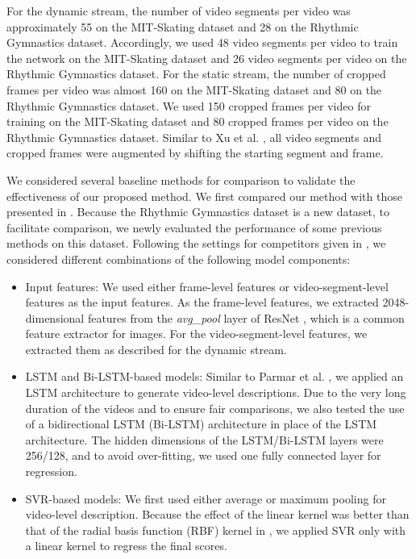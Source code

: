 \documentclass[sigconf]{acmart}
\begin{document}
\vspace{5pt}

For the dynamic stream, the number of video segments per video was approximately 55 on the MIT-Skating dataset and 28 on the Rhythmic Gymnastics dataset. Accordingly, we used 48 video segments per video to train the network on the MIT-Skating dataset and 26 video segments per video on the Rhythmic Gymnastics dataset. For the static stream, the number of cropped frames per video was almost 160 on the MIT-Skating dataset and 80 on the Rhythmic Gymnastics dataset. We used 150 cropped frames per video for training on the MIT-Skating dataset and 80 cropped frames per video on the Rhythmic Gymnastics dataset. Similar to Xu et al. \cite{xu2019learning}, all video segments and cropped frames were augmented by shifting the starting segment and frame.

\vspace{5pt}

We considered several baseline methods for comparison to validate the effectiveness of our proposed method. We first compared our method with those presented in \cite{pirsiavash2014assessing,le2011learning,parmar2017learning,li2018end,xu2019learning}. Because the Rhythmic Gymnastics dataset is a new dataset, to facilitate comparison, we newly evaluated the performance of some previous methods \cite{parmar2017learning, xu2019learning} on this dataset. Following the settings for competitors given in \cite{xu2019learning}, we considered different combinations of the following model components:
\vspace{-0.5cm}
\begin{itemize}
\item Input features: We used either frame-level features or video-segment-level features as the input features. As the frame-level features, we extracted 2048-dimensional features from the \emph{avg\_pool} layer of ResNet \cite{he2016deep}, which is a common feature extractor for images. For the video-segment-level features, we extracted them as described for the dynamic stream.
\item LSTM and Bi-LSTM-based models: Similar to Parmar et al. \cite{parmar2017learning}, we applied an LSTM architecture to generate video-level descriptions. Due to the very long duration of the videos and to ensure fair comparisons, we also tested the use of a bidirectional LSTM (Bi-LSTM) architecture in place of the LSTM architecture. The hidden dimensions of the LSTM/Bi-LSTM layers were 256/128, and to avoid over-fitting, we used one fully connected layer for regression.
\item SVR-based models: We first used either average or maximum pooling for video-level description. Because the effect of the linear kernel was better than that of the radial basis function (RBF) kernel in \cite{xu2019learning}, we applied SVR only with a linear kernel to regress the final scores.
\end{itemize}
\end{document}
